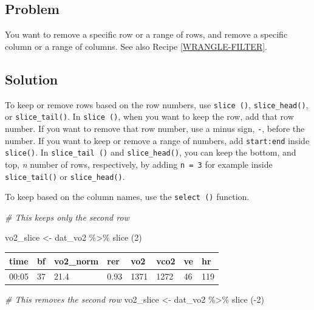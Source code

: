 \documentclass[
]{book}
\newenvironment{Shaded}{\begin{snugshade}}{\end{snugshade}}
\newcommand{\CommentTok}[1]{\textcolor[rgb]{0.56,0.35,0.01}{\textit{#1}}}
\newcommand{\DecValTok}[1]{\textcolor[rgb]{0.00,0.00,0.81}{#1}}
\newcommand{\FunctionTok}[1]{\textcolor[rgb]{0.00,0.00,0.00}{#1}}
\newcommand{\NormalTok}[1]{#1}
\newcommand{\OtherTok}[1]{\textcolor[rgb]{0.56,0.35,0.01}{#1}}
\newcommand{\SpecialCharTok}[1]{\textcolor[rgb]{0.00,0.00,0.00}{#1}}
\begin{document}
\hypertarget{problem-1}{%
\subsection{Problem}\label{problem-1}}

You want to remove a specific row or a range of rows, and remove a specific column or a range of columns. See also Recipe \ref{WRANGLE-FILTER}.

\hypertarget{solution-1}{%
\subsection{Solution}\label{solution-1}}

To keep or remove rows based on the row numbers, use \texttt{slice\ ()}, \texttt{slice\_head()}, or \texttt{slice\_tail()}. In \texttt{slice\ ()}, when you want to keep the row, add that row number. If you want to remove that row number, use a minus sign, \texttt{-}, before the number. If you want to keep or remove a range of numbers, add \texttt{start:end} inside \texttt{slice()}. In \texttt{slice\_tail\ ()} and \texttt{slice\_head()}, you can keep the bottom, and top, \emph{n} number of rows, respectively, by adding \texttt{n\ =\ 3} for example inside \texttt{slice\_tail()} or \texttt{slice\_head()}.

To keep based on the column names, use the \texttt{select\ ()} function.

\begin{Shaded}
\begin{Highlighting}[]
\CommentTok{\# This keeps only the second row}

\NormalTok{vo2\_slice }\OtherTok{\textless{}{-}}\NormalTok{ dat\_vo2 }\SpecialCharTok{\%\textgreater{}\%} 
  \FunctionTok{slice}\NormalTok{ (}\DecValTok{2}\NormalTok{) }
\end{Highlighting}
\end{Shaded}

\begin{tabular}{l|l|l|l|l|l|l|l}
\hline
time & bf & vo2\_norm & rer & vo2 & vco2 & ve & hr\\
\hline
00:05 & 37 & 21.4 & 0.93 & 1371 & 1272 & 46 & 119\\
\hline
\end{tabular}

\begin{Shaded}
\begin{Highlighting}[]
\CommentTok{\# This removes the second row}
\NormalTok{vo2\_slice }\OtherTok{\textless{}{-}}\NormalTok{ dat\_vo2 }\SpecialCharTok{\%\textgreater{}\%} 
  \FunctionTok{slice}\NormalTok{ (}\SpecialCharTok{{-}}\DecValTok{2}\NormalTok{) }
\end{Highlighting}
\end{Shaded}
\end{document}
